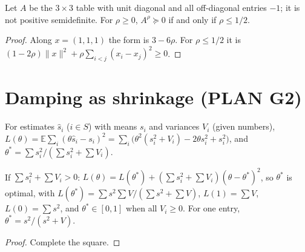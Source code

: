 \begin{theorem}\label{thm:shrinkOffDiag_negOne}
  \leanok
  Let $A$ be the $3 \times 3$ table with unit diagonal and all off-diagonal
  entries $-1$; it is not positive semidefinite. For $\rho \ge 0$,
  $A^\rho \succeq 0$ if and only if $\rho \le 1/2$.
\end{theorem}
\begin{proof}
  \leanok
  Along $x = (1, 1, 1)$ the form is $3 - 6\rho$. For $\rho \le 1/2$ it is
  $(1 - 2\rho)\|x\|^2 + \rho\sum_{i<j}(x_i - x_j)^2 \ge 0$.
\end{proof}

\section{Damping as shrinkage (PLAN G2)}

\begin{definition}\label{def:dampLoss}
  \leanok
  For estimates $\hat s_i$ ($i \in S$) with means $s_i$ and variances $V_i$ (given numbers),
  $L(\theta) = \mathbb{E}\sum_i(\theta\hat s_i - s_i)^2
  = \sum_i \bigl(\theta^2(s_i^2 + V_i) - 2\theta s_i^2 + s_i^2\bigr)$, and
  $\theta^* = \sum s_i^2 / (\sum s_i^2 + \sum V_i)$.
\end{definition}

\begin{theorem}\label{thm:bestTheta}
  \leanok
  If $\sum s_i^2 + \sum V_i > 0$: $L(\theta) = L(\theta^*) + (\sum s_i^2 + \sum V_i)(\theta - \theta^*)^2$,
  so $\theta^*$ is optimal, with $L(\theta^*) = \sum s^2 \sum V / (\sum s^2 + \sum V)$,
  $L(1) = \sum V$, $L(0) = \sum s^2$, and $\theta^* \in [0, 1]$ when all $V_i \ge 0$.
  For one entry, $\theta^* = s^2/(s^2 + V)$.
\end{theorem}
\begin{proof}
  \leanok
  Complete the square.
\end{proof}

